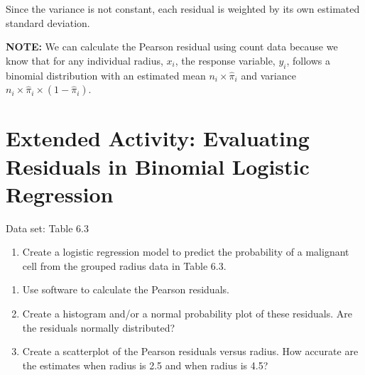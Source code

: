 \documentclass[
]{report}
\providecommand{\tightlist}{%
  \setlength{\itemsep}{0pt}\setlength{\parskip}{0pt}}
\begin{document}
Since the variance is not constant, each residual is weighted by its own estimated standard deviation.

\large

\textbf{NOTE:}
We can calculate the Pearson residual using count data because we know that for any individual radius, \(x_i\), the response variable, \(y_i\), follows a binomial distribution with an estimated mean \(n_i \times \hat\pi_i\) and variance \(n_i \times \hat\pi_i \times (1 - \hat\pi_i)\).\\
\normalsize

\hypertarget{extended-activity-evaluating-residuals-in-binomial-logistic-regression}{%
\section*{Extended Activity: Evaluating Residuals in Binomial Logistic Regression}\label{extended-activity-evaluating-residuals-in-binomial-logistic-regression}}

Data set: Table 6.3

\begin{enumerate}
\def\labelenumi{\arabic{enumi}.}
\setcounter{enumi}{26}
\tightlist
\item
  Create a logistic regression model to predict the probability of a malignant cell from the grouped radius data in Table 6.3.\\
\end{enumerate}

\begin{enumerate}
\def\labelenumi{\alph{enumi}.}
\tightlist
\item
  Use software to calculate the Pearson residuals.\\
\item
  Create a histogram and/or a normal probability plot of these residuals. Are the residuals normally distributed?\\
\item
  Create a scatterplot of the Pearson residuals versus radius. How accurate are the estimates when radius is 2.5 and when radius is 4.5?
\end{enumerate}
\end{document}
